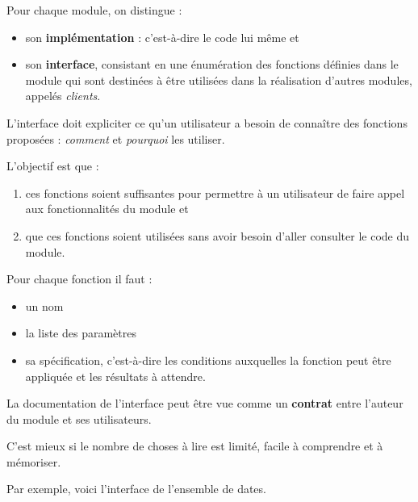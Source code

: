 \documentclass[a4paper,17pt]{extarticle}
\providecommand{\tightlist}{%
      \setlength{\itemsep}{0pt}\setlength{\parskip}{0pt}}
\begin{document}
    Pour chaque module, on distingue :

\begin{itemize}
\tightlist
\item
  son \textbf{implémentation} : c'est-à-dire le code lui même et
\item
  son \textbf{interface}, consistant en une énumération des fonctions
  définies dans le module qui sont destinées à être utilisées dans la
  réalisation d'autres modules, appelés \emph{clients}.
\end{itemize}

    L'interface doit expliciter ce qu'un utilisateur a besoin de connaître
des fonctions proposées : \emph{comment} et \emph{pourquoi} les
utiliser.

L'objectif est que :

\begin{enumerate}
\def\labelenumi{\arabic{enumi}.}
\tightlist
\item
  ces fonctions soient suffisantes pour permettre à un utilisateur de
  faire appel aux fonctionnalités du module et
\item
  que ces fonctions soient utilisées sans avoir besoin d'aller consulter
  le code du module.
\end{enumerate}

Pour chaque fonction il faut :

\begin{itemize}
\tightlist
\item
  un nom
\item
  la liste des paramètres
\item
  sa spécification, c'est-à-dire les conditions auxquelles la fonction
  peut être appliquée et les résultats à attendre.
\end{itemize}

    La documentation de l'interface peut être vue comme un \textbf{contrat}
entre l'auteur du module et ses utilisateurs.

C'est mieux si le nombre de choses à lire est limité, facile à
comprendre et à mémoriser.

    Par exemple, voici l'interface de l'ensemble de dates.
\end{document}
